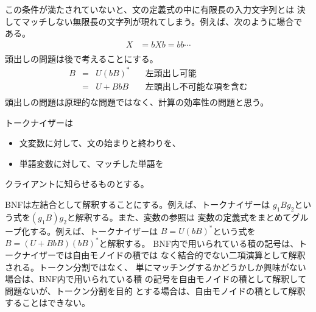 {	この条件が満たされていないと、文の定義式の中に有限長の入力文字列とは
	決してマッチしない無限長の文字列が現れてしまう。例えば、次のように場合で
	ある。
	\begin{equation*}\begin{split}
		X &= bXb = bb\cdots \\
	\end{split}\end{equation*}
	頭出しの問題は後で考えることにする。
	\begin{equation*}\begin{array}{rcll}
		B &=& U (b B)^* & \quad\text{左頭出し可能} \\
		&=& U + B b B & \quad\text{左頭出し不可能な項を含む} \\
	\end{array}\end{equation*}
	頭出しの問題は原理的な問題ではなく、計算の効率性の問題と思う。

	トークナイザーは
	\begin{itemize}\setlength{\itemsep}{-1mm} %
		\item 文変数に対して、文の始まりと終わりを、
		\item 単語変数に対して、マッチした単語を
	\end{itemize} %
	クライアントに知らせるものとする。

	BNFは左結合として解釈することにする。例えば、トークナイザーは
	$g_1Bg_2$という式を$(g_1B)g_2$と解釈する。また、変数の参照は
	変数の定義式をまとめてグループ化する。例えば、トークナイザーは
	$B=U(bB)^*$という式を$B=(U+BbB)(bB)^*$と解釈する。
	BNF内で用いられている積の記号は、トークナイザーでは自由モノイドの積では
	なく結合的でない二項演算として解釈される。トークン分割ではなく、
	単にマッチングするかどうかしか興味がない場合は、BNF内で用いられている積
	の記号を自由モノイドの積として解釈して問題ないが、トークン分割を目的
	とする場合は、自由モノイドの積として解釈することはできない。
}
